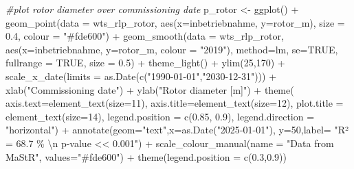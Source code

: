 \documentclass[a4paper,11pt]{article}
\newenvironment{Shaded}{\begin{snugshade}}{\end{snugshade}}
\newcommand{\AttributeTok}[1]{\textcolor[rgb]{0.77,0.63,0.00}{#1}}
\newcommand{\CommentTok}[1]{\textcolor[rgb]{0.56,0.35,0.01}{\textit{#1}}}
\newcommand{\ConstantTok}[1]{\textcolor[rgb]{0.00,0.00,0.00}{#1}}
\newcommand{\DecValTok}[1]{\textcolor[rgb]{0.00,0.00,0.81}{#1}}
\newcommand{\FloatTok}[1]{\textcolor[rgb]{0.00,0.00,0.81}{#1}}
\newcommand{\FunctionTok}[1]{\textcolor[rgb]{0.00,0.00,0.00}{#1}}
\newcommand{\NormalTok}[1]{#1}
\newcommand{\OtherTok}[1]{\textcolor[rgb]{0.56,0.35,0.01}{#1}}
\newcommand{\SpecialCharTok}[1]{\textcolor[rgb]{0.00,0.00,0.00}{#1}}
\newcommand{\StringTok}[1]{\textcolor[rgb]{0.31,0.60,0.02}{#1}}
\begin{document}
\begin{Shaded}
\begin{Highlighting}[]
\CommentTok{\#plot rotor diameter over commissioning date}
\NormalTok{p\_rotor }\OtherTok{\textless{}{-}} \FunctionTok{ggplot}\NormalTok{() }\SpecialCharTok{+}
  \FunctionTok{geom\_point}\NormalTok{(}\AttributeTok{data =}\NormalTok{ wts\_rlp\_rotor, }\FunctionTok{aes}\NormalTok{(}\AttributeTok{x=}\NormalTok{inbetriebnahme, }\AttributeTok{y=}\NormalTok{rotor\_m), }
             \AttributeTok{size =} \FloatTok{0.4}\NormalTok{, }\AttributeTok{colour =} \StringTok{"\#fde600"}\NormalTok{) }\SpecialCharTok{+}
  \FunctionTok{geom\_smooth}\NormalTok{(}\AttributeTok{data =}\NormalTok{ wts\_rlp\_rotor, }
              \FunctionTok{aes}\NormalTok{(}\AttributeTok{x=}\NormalTok{inbetriebnahme, }\AttributeTok{y=}\NormalTok{rotor\_m, }\AttributeTok{colour =} \StringTok{"2019"}\NormalTok{), }
              \AttributeTok{method=}\NormalTok{lm, }\AttributeTok{se=}\ConstantTok{TRUE}\NormalTok{, }\AttributeTok{fullrange =} \ConstantTok{TRUE}\NormalTok{, }\AttributeTok{size =} \FloatTok{0.5}\NormalTok{)  }\SpecialCharTok{+}
  \FunctionTok{theme\_light}\NormalTok{() }\SpecialCharTok{+}
  \FunctionTok{ylim}\NormalTok{(}\DecValTok{25}\NormalTok{,}\DecValTok{170}\NormalTok{) }\SpecialCharTok{+}
  \FunctionTok{scale\_x\_date}\NormalTok{(}\AttributeTok{limits =} \FunctionTok{as.Date}\NormalTok{(}\FunctionTok{c}\NormalTok{(}\StringTok{"1990{-}01{-}01"}\NormalTok{,}\StringTok{"2030{-}12{-}31"}\NormalTok{))) }\SpecialCharTok{+}
  \FunctionTok{xlab}\NormalTok{(}\StringTok{"Commissioning date"}\NormalTok{) }\SpecialCharTok{+}
  \FunctionTok{ylab}\NormalTok{(}\StringTok{"Rotor diameter [m]"}\NormalTok{) }\SpecialCharTok{+}
  \FunctionTok{theme}\NormalTok{( }\AttributeTok{axis.text=}\FunctionTok{element\_text}\NormalTok{(}\AttributeTok{size=}\DecValTok{11}\NormalTok{),}
         \AttributeTok{axis.title=}\FunctionTok{element\_text}\NormalTok{(}\AttributeTok{size=}\DecValTok{12}\NormalTok{),}
         \AttributeTok{plot.title =} \FunctionTok{element\_text}\NormalTok{(}\AttributeTok{size=}\DecValTok{14}\NormalTok{),}
         \AttributeTok{legend.position =} \FunctionTok{c}\NormalTok{(}\FloatTok{0.85}\NormalTok{, }\FloatTok{0.9}\NormalTok{),}
         \AttributeTok{legend.direction =} \StringTok{"horizontal"}\NormalTok{) }\SpecialCharTok{+}
  \FunctionTok{annotate}\NormalTok{(}\AttributeTok{geom=}\StringTok{"text"}\NormalTok{,}\AttributeTok{x=}\FunctionTok{as.Date}\NormalTok{(}\StringTok{"2025{-}01{-}01"}\NormalTok{),}
           \AttributeTok{y=}\DecValTok{50}\NormalTok{,}\AttributeTok{label=} \StringTok{"R² = 68.7 \% }\SpecialCharTok{\textbackslash{}n}\StringTok{ p{-}value \textless{}\textless{} 0.001"}\NormalTok{) }\SpecialCharTok{+}
  \FunctionTok{scale\_colour\_manual}\NormalTok{(}\AttributeTok{name =} \StringTok{"Data from MaStR"}\NormalTok{, }
                      \AttributeTok{values=}\StringTok{"\#fde600"}\NormalTok{) }\SpecialCharTok{+}
  \FunctionTok{theme}\NormalTok{(}\AttributeTok{legend.position =} \FunctionTok{c}\NormalTok{(}\FloatTok{0.3}\NormalTok{,}\FloatTok{0.9}\NormalTok{))}



\end{Highlighting}
\end{Shaded}
\end{document}
